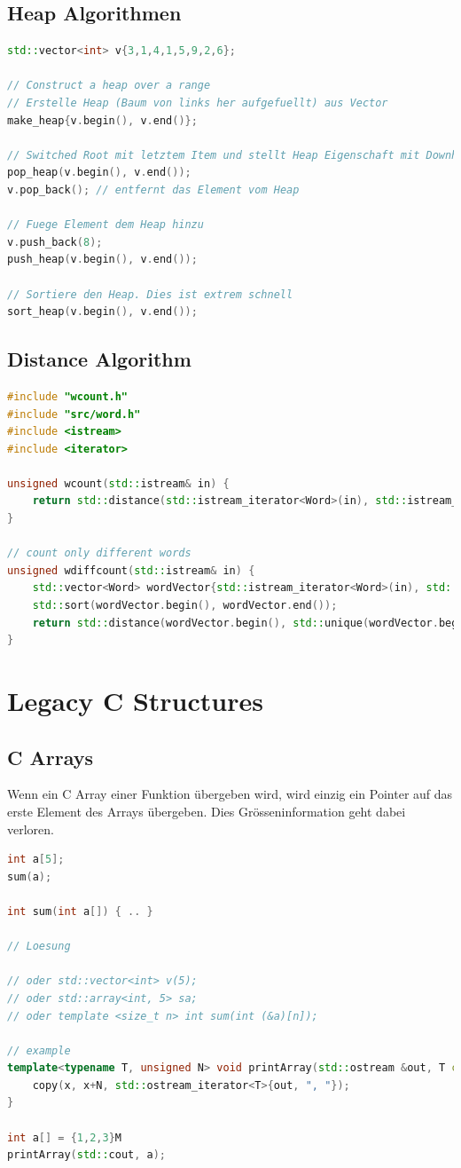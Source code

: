 \newpage
\subsection{Heap Algorithmen}
\begin{lstlisting}[language=C++, caption=Heap Algorithmen]
std::vector<int> v{3,1,4,1,5,9,2,6};

// Construct a heap over a range
// Erstelle Heap (Baum von links her aufgefuellt) aus Vector
make_heap{v.begin(), v.end()};

// Switched Root mit letztem Item und stellt Heap Eigenschaft mit Downheap wieder her
pop_heap(v.begin(), v.end());
v.pop_back(); // entfernt das Element vom Heap

// Fuege Element dem Heap hinzu
v.push_back(8);
push_heap(v.begin(), v.end());

// Sortiere den Heap. Dies ist extrem schnell
sort_heap(v.begin(), v.end());
\end{lstlisting}


\subsection{Distance Algorithm}
\begin{lstlisting}[language=C++, caption=Distance ALgorithm] 
#include "wcount.h"
#include "src/word.h"
#include <istream>
#include <iterator>

unsigned wcount(std::istream& in) {
	return std::distance(std::istream_iterator<Word>(in), std::istream_iterator<Word>());
}

// count only different words
unsigned wdiffcount(std::istream& in) {
	std::vector<Word> wordVector{std::istream_iterator<Word>(in), std::istream_iterator<Word>()};
	std::sort(wordVector.begin(), wordVector.end());
	return std::distance(wordVector.begin(), std::unique(wordVector.begin(), wordVector.end()));
}
\end{lstlisting}

\section{Legacy C Structures}
\subsection{C Arrays}
Wenn ein C Array einer Funktion übergeben wird, wird einzig ein Pointer auf das erste Element des Arrays übergeben. Dies Grösseninformation geht dabei verloren.
\begin{lstlisting}[language=C++] 
int a[5];
sum(a); 

int sum(int a[]) { .. }

// Loesung

// oder std::vector<int> v(5);
// oder std::array<int, 5> sa;
// oder template <size_t n> int sum(int (&a)[n]);

// example 
template<typename T, unsigned N> void printArray(std::ostream &out, T const (&x)[N]) {
	copy(x, x+N, std::ostream_iterator<T>{out, ", "});
}

int a[] = {1,2,3}M
printArray(std::cout, a);
\end{lstlisting}


